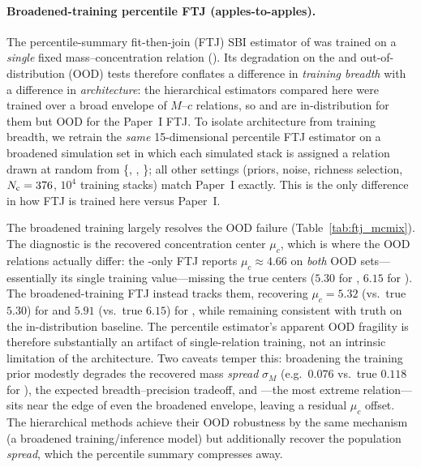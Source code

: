 
\paragraph{Broadened-training percentile FTJ (apples-to-apples).}
The percentile-summary fit-then-join (FTJ) SBI estimator of  was trained on a
\emph{single} fixed mass--concentration relation (). Its degradation on the
 and  out-of-distribution (OOD) tests therefore conflates a difference in
\emph{training breadth} with a difference in \emph{architecture}: the hierarchical estimators compared
here were trained over a broad envelope of $M$--$c$ relations, so  and 
are in-distribution for them but OOD for the Paper~I FTJ. To isolate architecture from training
breadth, we retrain the \emph{same} 15-dimensional percentile FTJ estimator on a broadened simulation
set in which each simulated stack is assigned a relation drawn at random from \{,
, \}; all other settings (priors, noise, richness selection,
$N_{\rm c}=376$, $10^{4}$ training stacks) match Paper~I exactly. This is the only difference in how
FTJ is trained here versus Paper~I.

The broadened training largely resolves the OOD failure (Table~\ref{tab:ftj_mcmix}). The diagnostic
is the recovered concentration center $\mu_c$, which is where the OOD relations actually differ: the
-only FTJ reports $\mu_c\approx4.66$ on \emph{both} OOD sets---essentially its single
training value---missing the true centers ($5.30$ for , $6.15$ for ). The
broadened-training FTJ instead tracks them, recovering $\mu_c=5.32$ (vs.\ true $5.30$) for
 and $5.91$ (vs.\ true $6.15$) for , while remaining consistent with truth
on the in-distribution baseline. The percentile estimator's apparent OOD fragility is therefore
substantially an artifact of single-relation training, not an intrinsic limitation of the
architecture. Two caveats temper this: broadening the training prior modestly degrades the recovered
mass \emph{spread} $\sigma_M$ (e.g.\ $0.076$ vs.\ true $0.118$ for ), the expected
breadth--precision tradeoff, and ---the most extreme relation---sits near the edge of even
the broadened envelope, leaving a residual $\mu_c$ offset. The hierarchical methods achieve their OOD
robustness by the same mechanism (a broadened training/inference model) but additionally recover the
population \emph{spread}, which the percentile summary compresses away.

